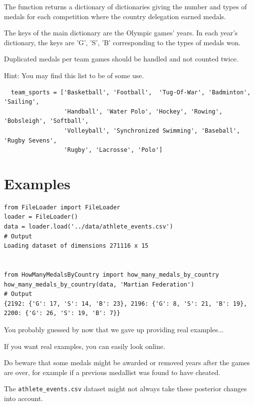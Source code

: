 \documentclass{42-en}
\begin{document}
The function returns a dictionary of dictionaries giving the number and
types of medals for each competition where the country delegation earned medals.

The keys of the main dictionary are the Olympic games' years. In each
year's dictionary, the keys are 'G', 'S', 'B' corresponding to the
types of medals won.

Duplicated medals per team games should be handled and not counted twice.

Hint: You may find this list to be of some use.

\begin{verbatim}
  team_sports = ['Basketball', 'Football',  'Tug-Of-War', 'Badminton', 'Sailing',
                 'Handball', 'Water Polo', 'Hockey', 'Rowing', 'Bobsleigh', 'Softball',
                 'Volleyball', 'Synchronized Swimming', 'Baseball', 'Rugby Sevens',
                 'Rugby', 'Lacrosse', 'Polo']
\end{verbatim}

\section*{Examples}
\begin{verbatim}
from FileLoader import FileLoader
loader = FileLoader()
data = loader.load('../data/athlete_events.csv')
# Output
Loading dataset of dimensions 271116 x 15


from HowManyMedalsByCountry import how_many_medals_by_country
how_many_medals_by_country(data, 'Martian Federation')
# Output
{2192: {'G': 17, 'S': 14, 'B': 23}, 2196: {'G': 8, 'S': 21, 'B': 19}, 2200: {'G': 26, 'S': 19, 'B': 7}}
\end{verbatim}

You probably guessed by now that we gave up providing real examples...

If you want real examples, you can easily look online.

Do beware that some medals might be awarded or removed years after the games
are over, for example if a previous medallist was found to have cheated.

The \texttt{athlete\_events.csv} dataset might not always take these posterior
changes into account.

\end{document}
